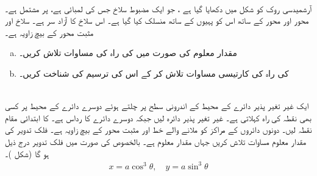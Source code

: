 \\
آرشمیدسی روک کو شکل  میں دکھایا گیا ہے ، جو ایک مضبوط سلاخ جس کی لمبائی  ہے، پر مشتمل ہے۔محور  اور محور     کے ساتھ اس کو پہیوں کے ساتھ منسلک کیا گیا ہے۔ اس سلاخ کا آزاد سر  ہے۔ سلاخ اور مثبت محور  کے بیچ زاویہ  ہے۔
\begin{enumerate}[a.]
\item
مقدار معلوم  کی صورت میں  کی راہ کی مساوات تلاش کریں۔
\item
{} کی راہ کی کارتیسی مساوات تلاش کر کے اس کی ترسیم کی شناخت کریں۔
\end{enumerate}
\\
ایک غیر تغیر پذیر دائرے کے محیط کے  اندرونی سطح پر چلتے ہوئے دوسرے  دائرے کے  محیط پر کسی بھی نقطہ  کی راہ  کہلاتی ہے۔ غیر تغیر پذیر دائرہ  لیں جبکہ دوسرے دائرے کا رداس  ہے۔  کا ابتدائی مقام نقطہ  لیں۔ دونوں دائروں کے مراکز کو ملانے والے خط اور مثبت محور  کے بیچ زاویہ  ہے۔  فلک تدویر کی مقدار معلوم مساوات تلاش کریں جہاں مقدار معلوم  ہے۔ بالخصوص  کی صورت میں فلک تدویر درج ذیل  ہو گا (شکل )۔
\begin{align*}
x=a\cos^3\theta,\quad y=a\sin^3\theta
\end{align*}

